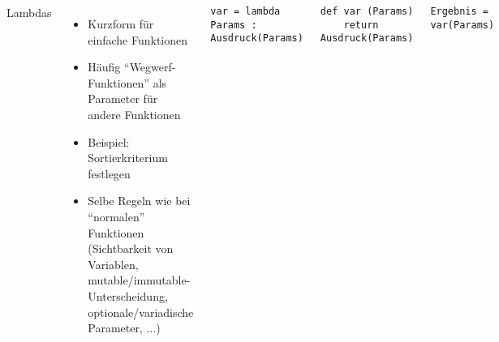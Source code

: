 \begin{frame}[fragile]
\begin{tcolorbox}[title=Speicherbild]
\begin{center}
\end{center}
\end{tcolorbox}
%
\end{frame}


\begin{frame}[fragile]
%
\begin{columns}[T]
\begin{Large}
	{Lambdas}
\end{Large}
\vspace{6pt}
\begin{itemize}
\item Kurzform für einfache Funktionen
\item Häufig \enquote{Wegwerf-Funktionen} als Parameter für andere Funktionen
\item Beispiel: Sortierkriterium festlegen
\item Selbe Regeln wie bei \enquote{normalen} Funktionen (Sichtbarkeit von Variablen, mutable/immutable-Unterscheidung, optionale/variadische Parameter, ...)
\end{itemize}
%
\begin{codebox}
\begin{verbatim}
var = lambda Params : Ausdruck(Params)
\end{verbatim}
\end{codebox}
%
\begin{codebox}
\begin{verbatim}
def var (Params)
    return Ausdruck(Params)
\end{verbatim}
\end{codebox}
%
\begin{codebox}
\begin{verbatim}
Ergebnis = var(Params)
\end{verbatim}
\end{codebox}
\end{columns}
%
\end{frame}

